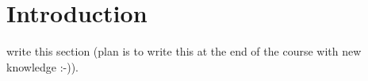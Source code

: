 \section{Introduction}
\TODO write this section (plan is to write this at the end of the course with new knowledge :-)). 